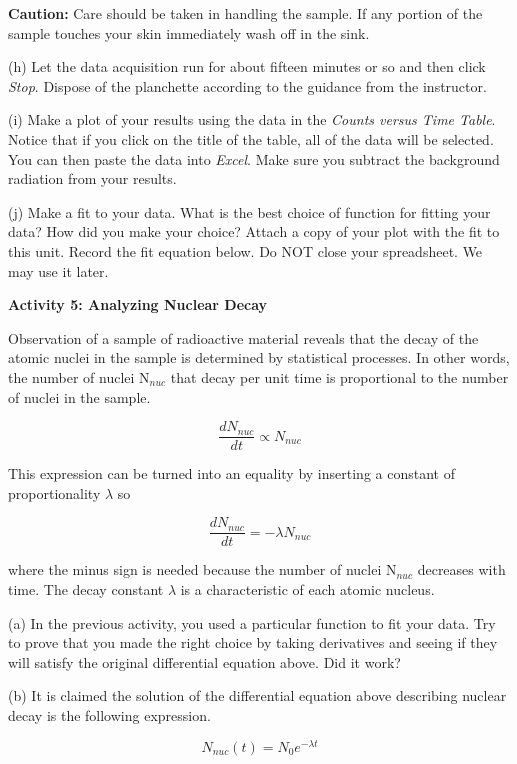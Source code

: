 {\bf Caution:} Care should be taken in handling the sample.
If any portion of the sample touches your skin immediately wash off in the sink.

(h) Let the data acquisition run for about fifteen minutes or so and then click \textit{Stop}.
Dispose of the planchette according to the guidance from the instructor.

(i) Make a plot of your results using the data in the {\it Counts versus Time Table}. 
Notice that if you 
click on the title of the table, all of the
data will be selected. You can then paste the data into {\it Excel}.
Make sure you subtract the background radiation from your results.

(j) Make a fit to your data. What is the best choice of function for fitting 
your data? How did you make your choice?
Attach a copy of your plot with the fit to this unit.
Record the fit equation below.
Do NOT close your spreadsheet. We may use it later.

\vspace{0.5in}

\textbf{Activity 5: Analyzing Nuclear Decay }

Observation of a sample of radioactive material reveals that the decay
of the atomic nuclei in the sample is determined by statistical processes.
In other words, the number of nuclei N\( _{nuc} \) that decay per
unit time is proportional to the number of nuclei in the sample.

\[
\frac{dN_{nuc}}{dt}\propto N_{nuc}\]


This expression can be turned into an equality by inserting a constant
of proportionality \( \lambda  \) so

\[
\frac{dN_{nuc}}{dt}=-\lambda N_{nuc}\]


where the minus sign is needed because the number of nuclei N\( _{nuc} \)
decreases with time. The decay constant \( \lambda  \) is a characteristic
of each atomic nucleus. 

(a) In the previous activity, you used a particular function to fit 
your data.
Try to prove that you made the right choice by taking derivatives and
seeing if they will satisfy the original differential equation above.
Did it work?
\vspace{30mm}

(b) It is claimed the solution of the differential equation above
describing nuclear decay is the following expression.

\[
N_{nuc}(t)=N_{0}e^{-\lambda t}\]



